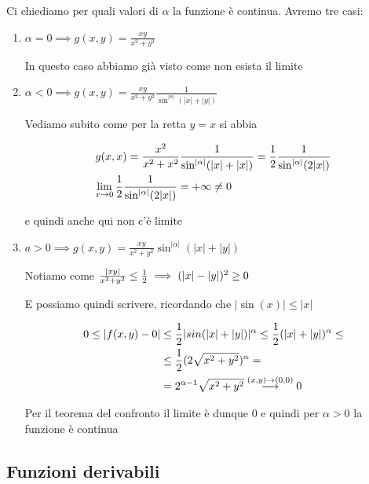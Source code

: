 \begin{enumerate}
	Ci chiediamo per quali valori di $\alpha$ la funzione è continua. Avremo tre casi:
	
		\begin{enumerate}
			\item $\alpha = 0 \implies g(x,y)=\frac{xy}{x^2 + y^2}$
			
			\smallskip
			
			In questo caso abbiamo già visto come non esista il limite
			
			\smallskip
						
			\item $\alpha < 0 \implies g(x,y)=\frac{xy}{x^2 + y^2} \frac{1}{\sin^{|\alpha|}(|x| + |y|)}$
			
			\smallskip
			
			Vediamo subito come per la retta $y=x$ si abbia
			
			\begin{align}
			{}&g(x,x)= \frac{x^2}{x^2 + x^2} \frac{1}{\sin^{|\alpha|}(|x|+|x|)}=\frac{1}{2} \frac{1}{\sin^{|\alpha|}(2|x|)}\\
			&\underset{x \rightarrow 0}{\lim} \,\frac{1}{2} \frac{1}{\sin^{|\alpha|}(2|x|)}=+\infty\neq 0
			\end{align}
			
			e quindi anche qui non c'è limite
			
			\item $a>0 \implies g(x,y)= \frac{xy}{x^2 + y^2}\sin^{|\alpha|}(|x| + |y|)$
			
			\smallskip
			
			Notiamo come $\frac{|xy|}{x^2 + y^2}\leq \frac{1}{2} \implies (|x| - |y|)^2 \geq 0$
			
			E possiamo quindi scrivere, ricordando che $|\sin(x)|\leq |x|$
			
			\begin{align}
			0\leq |f(x,y)-0| {}&\leq \frac{1}{2} |sin(|x|+|y|)|^\alpha \leq \frac{1}{2} (|x|+|y|)^\alpha \leq \nonumber \\
			&\leq \frac{1}{2} (2\sqrt{x^2 + y^2})^\alpha = \nonumber \\ 
			&=2^{\alpha-1}\sqrt{x^2 + y^2}\overset{(x,y) \rightarrow (0,0)}{\longrightarrow} 0
			\end{align}
			
			Per il teorema del confronto il limite è dunque $0$ e quindi per $\alpha>0$ la funzione è continua
						\end{enumerate}
\end{enumerate}

\newpage

\subsection{Funzioni derivabili}

